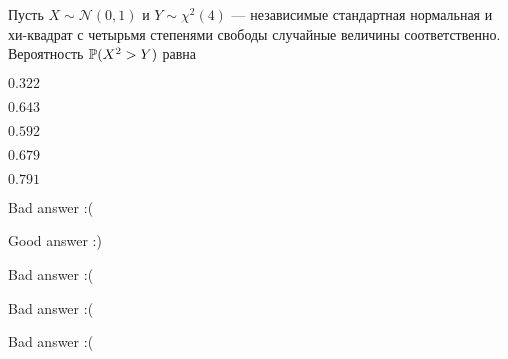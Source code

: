 
\begin{question}
Пусть \(X\sim\mathcal{N}(0,1)\) и \(Y\sim\chi^{2}(4)\) --- независимые
стандартная нормальная и хи-квадрат с четырьмя степенями свободы
случайные величины соответственно. Вероятность \(\P(X^2>Y)\) равна
\begin{answerlist}
  \item \(0.322\)
  \item \(0.643\)
  \item \(0.592\)
  \item \(0.679\)
  \item \(0.791\)
\end{answerlist}
\end{question}

\begin{solution}
\begin{answerlist}
  \item Bad answer :(
  \item Good answer :)
  \item Bad answer :(
  \item Bad answer :(
  \item Bad answer :(
\end{answerlist}
\end{solution}

